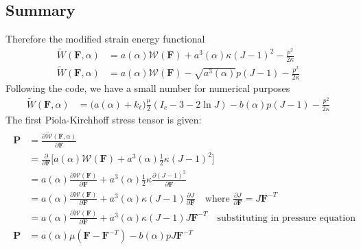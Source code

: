 \documentclass[12pt,3p]{article}
\numberwithin{equation}{section}
\begin{document}
\subsection{Summary}
Therefore the modified strain energy functional 
\begin{align*}
\widetilde{W} (\mathbf{F}, \alpha) &= a(\alpha) \mathcal{W} (\mathbf{F}) + a^3 (\alpha)\kappa (J-1)^2 - \frac{p^2}{2 \kappa} \\
\widetilde{W} (\mathbf{F}, \alpha) &= a(\alpha) \mathcal{W} (\mathbf{F}) - \sqrt{a^3 (\alpha)} p (J-1) - \frac{p^2}{2 \kappa} 
\end{align*}
Following the code, we have a small number for numerical purposes 
\begin{align*}
\widetilde{W} (\mathbf{F}, \alpha) &= \big( a(\alpha) + k_\ell) \frac{\mu}{2} (I_c - 3 - 2 \ln J) - b(\alpha) p (J-1) - \frac{p^2}{2 \kappa}
\end{align*}
The first Piola-Kirchhoff stress tensor is given: 
\begin{align}\label{eq_firstPK}
\begin{split}
\mathbf{P} &= \frac{\partial \widetilde{\mathcal{W}}(\mathbf{F},\alpha)}{\partial \mathbf{F}} \\
		 &= \frac{\partial}{\partial \mathbf{F}} \bigg[ a(\alpha)\mathcal{W}(\mathbf{F}) + a^3(\alpha) \frac{1}{2}\kappa\left(J-1\right)^2 \bigg] \\
		 &= a(\alpha)\frac{\partial \mathcal{W}(\mathbf{F})}{\partial \mathbf{F}} + a^3(\alpha) \frac{1}{2} \kappa \frac{\partial (J-1)^2}{\partial \mathbf{F}}  \\
		 &= a(\alpha)\frac{\partial \mathcal{W}(\mathbf{F})}{\partial \mathbf{F}} + a^3(\alpha)\kappa\left(J-1\right)\frac{\partial J}{\partial \mathbf{F}} \quad \text{where } \frac{\partial J}{\partial \mathbf{F}} = J \mathbf{F}^{-T} \\
		 &= a(\alpha)\frac{\partial \mathcal{W}(\mathbf{F})}{\partial \mathbf{F}} + a^3(\alpha)\kappa (J-1) J \mathbf{F}^{-T} \quad \text{substituting in pressure equation} \\
\mathbf{P} &= a (\alpha) \mu (\mathbf{F} - \mathbf{F}^{-T}) - b(\alpha) p J \mathbf{F}^{-T} 
\end{split}
\end{align}

\end{document}
